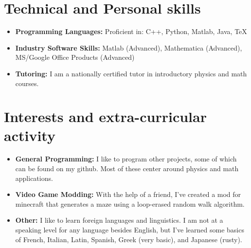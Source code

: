 \documentclass[10pt,a4paper,sans]{moderncv}        %
\begin{document}
\section{Technical and Personal skills}


\begin{itemize}[label={}]

\item \textbf{Programming Languages:} Proficient in: C++, Python, Matlab, Java, TeX

\item \textbf{Industry Software Skills:} Matlab (Advanced), Mathematica (Advanced),  MS/Google Office Products (Advanced)

\item \textbf{Tutoring:} I am a nationally certified tutor in introductory physics and math courses.

\end{itemize}

\section{Interests and extra-curricular activity}


\begin{itemize}[label={}]

\item \textbf{General Programming:}
I like to program other projects, some of which can be found on my github.
Most of these center around physics and math applications.

\item \textbf{Video Game Modding:}
With the help of a friend, I've created a mod for minecraft that generates a maze using a loop-erased random walk algorithm.

\item \textbf{Other:}
I like to learn foreign languages and linguistics. I am not at a speaking level for any language besides English, but I've learned some basics of French, Italian, Latin, Spanish, Greek (very basic), and Japanese (rusty).

\end{itemize}

\end{document}
